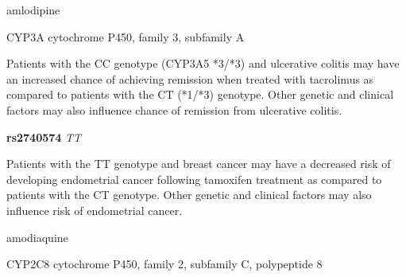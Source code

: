 \documentclass{resume} %
\begin{document}
\begin{rSection}{ amlodipine }
\begin{rSubsection}{ CYP3A }{ cytochrome P450, family 3, subfamily A }{}{}
\item[] Patients with the CC genotype (CYP3A5 *3/*3) and ulcerative colitis may have an increased chance of achieving remission when treated with tacrolimus as compared to patients with the CT (*1/*3) genotype. Other genetic and clinical factors may also influence chance of remission from ulcerative colitis. \item \textbf{ rs2740574 } \textit{ TT }
\item[] Patients with the TT genotype and breast cancer may have a decreased risk of developing endometrial cancer following tamoxifen treatment as compared to patients with the CT genotype. Other genetic and clinical factors may also influence risk of endometrial cancer.
\end{rSubsection}

\end{rSection}\begin{rSection}{ amodiaquine }
\item[]

\begin{rSubsection}{ CYP2C8 }{ cytochrome P450, family 2, subfamily C, polypeptide 8 }{}{}
\item[]


\end{rSubsection}
\end{rSection}
\end{document}
